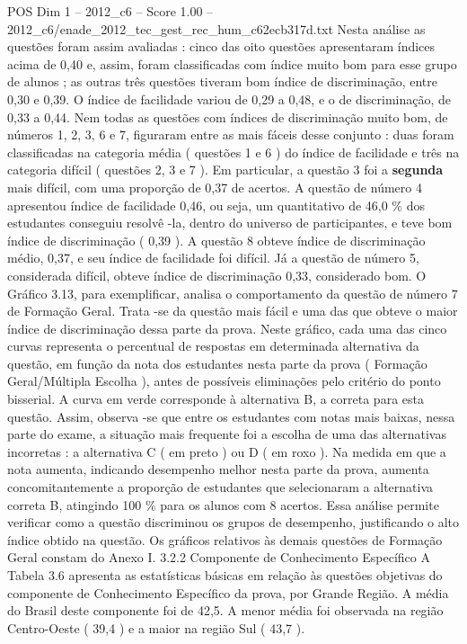 \begin{textsample}{POS Dim 1 – 2012\_c6 – Score 1.00 – 2012\_c6/enade\_2012\_tec\_gest\_rec\_hum\_c62ecb317d.txt}
Nesta análise as questões foram assim avaliadas : cinco das oito questões apresentaram índices acima de 0,40 e, assim, foram classificadas com índice muito bom para esse grupo de alunos ; as outras três questões tiveram bom índice de discriminação, entre 0,30 e 0,39.
O índice de facilidade variou de 0,29 a 0,48, e o de discriminação, de 0,33 a 0,44.
Nem todas as questões com índices de discriminação muito bom, de números 1, 2, 3, 6 e 7, figuraram entre as mais fáceis desse conjunto : duas foram classificadas na categoria média ( questões 1 e 6 ) do índice de facilidade e três na categoria difícil ( questões 2, 3 e 7 ).
Em particular, a questão 3 foi a \textbf{segunda} mais difícil, com uma proporção de 0,37 de acertos.
A questão de número 4 apresentou índice de facilidade 0,46, ou seja, um quantitativo de 46,0 \% dos estudantes conseguiu resolvê -la, dentro do universo de participantes, e teve bom índice de discriminação ( 0,39 ).
A questão 8 obteve índice de discriminação médio, 0,37, e seu índice de facilidade foi difícil.
Já a questão de número 5, considerada difícil, obteve índice de discriminação 0,33, considerado bom.
O Gráfico 3.13, para exemplificar, analisa o comportamento da questão de número 7 de Formação Geral.
Trata -se da questão mais fácil e uma das que obteve o maior índice de discriminação dessa parte da prova.
Neste gráfico, cada uma das cinco curvas representa o percentual de respostas em determinada alternativa da questão, em função da nota dos estudantes nesta parte da prova ( Formação Geral/Múltipla Escolha ), antes de possíveis eliminações pelo critério do ponto bisserial.
A curva em verde corresponde à alternativa B, a correta para esta questão.
Assim, observa -se que entre os estudantes com notas mais baixas, nessa parte do exame, a situação mais frequente foi a escolha de uma das alternativas incorretas : a alternativa C ( em preto ) ou D ( em roxo ).
Na medida em que a nota aumenta, indicando desempenho melhor nesta parte da prova, aumenta concomitantemente a proporção de estudantes que selecionaram a alternativa correta B, atingindo 100 \% para os alunos com 8 acertos.
Essa análise permite verificar como a questão discriminou os grupos de desempenho, justificando o alto índice obtido na questão.
Os gráficos relativos às demais questões de Formação Geral constam do Anexo I. 3.2.2 Componente de Conhecimento Específico A Tabela 3.6 apresenta as estatísticas básicas em relação às questões objetivas do componente de Conhecimento Específico da prova, por Grande Região.
A média do Brasil deste componente foi de 42,5.
A menor média foi observada na região Centro-Oeste ( 39,4 ) e a maior na região Sul ( 43,7 ).

\end{textsample}
